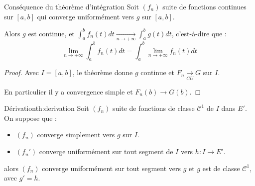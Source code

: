 \begin{corollaire}{Conséquence du théorème d'intégration}{}
    Soit $(f_n)$ suite de fonctions continues sur 
    $[a, b]$ qui converge uniformément vers $g$ sur $[a, b]$. 
    
    Alors $g$ est continue, et
    $\displaystyle \int_a^b f_n(t) dt \xrightarrow[n\to +\infty]{} \int_a^b g(t) dt$, c'est-à-dire
    que : \[\lim_{n \to +\infty} \int_a^b f_n(t) dt = \int_a^b \lim_{n \to +\infty} f_n(t) dt\]
\end{corollaire}


\begin{proof}
    \avspace Avec $I = [a, b]$, le théorème donne $g$ continue et $F_n \xrightarrow[CU]{} G$ sur $I$. 

    En particulier il y a convergence simple et $F_n(b) \to G(b)$.
\end{proof}

\begin{theoreme}{Dérivation}{th:derivation}
    Soit $(f_n)$ suite de fonctions de classe $\mathscr{C}^1$ de $I$ dans $E'$.
    On suppose que : 
    \begin{itemize}
        \item $(f_n)$ converge simplement vers $g$ sur $I$.
        \item $(f_n')$ converge uniformément sur tout segment de $I$ vers $h : I \to E'$.
    \end{itemize}

    alors $(f_n)$ converge uniformément sur tout segment vers $g$ et $g$ est de classe $\mathscr{C}^1$, 
    avec $g' = h$.
\end{theoreme}


